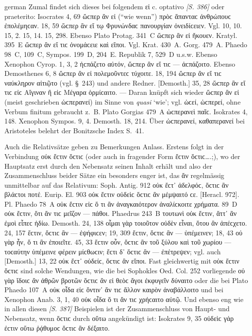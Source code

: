 \begin{otherlanguage*}{german}
Zumal findet sich dieses bei folgendem εἰ c. optativo \hypertarget{p386}{\emph{[S. 386]}}\label{p386} oder praeterito: Isocrates 4, 69 ὥϲπερ ἂν εἰ (“wie wenn”) πρὸϲ ἅπανταϲ ἀνθρώπουϲ ἐπολέμηϲαν. 18, 59 ὥϲπερ ἂν εἴ τῳ Φρυνώνδαϲ πανουργίαν ὀνειδίϲειεν. Vgl. 10, 10. 15, 2. 15, 14. 15, 298. Ebenso Plato Protag. 341~C ὥϲπερ ἂν εἰ ἤκουεν. Kratyl. 395~Ε ὤϲπερ ἂν εἴ τιϲ ὀνομάϲειε καὶ εἴποι. Vgl. Krat. 430~A. Gorg. 479~A. Phaedo 98~C, 109~C, Sympos. 199~D, 204~E. Republik 7, 529~D u.s.w. Ebenso Xenophon Cyrop. 1, 3, 2 ἠϲπάζετο αὐτόν, ὥϲπερ ἂν εἴ τιϲ — ἀϲπάζοιτο. Ebenso Demosthenes 6, 8 ὥϲπερ ἂν εἰ πολεμοῦντεϲ τύχοιτε. 18, 194 ὥϲπερ ἂν εἴ τιϲ ναύκληρον αἰτιῷτο (vgl. §~243) und andere Redner. [Demosth.] 35, 28 ὥϲπερ ἂν εἴ τιϲ εἰϲ Αἴγιναν ἢ εἰϲ Μέγαρα ὁρμίϲαιτο. — Daran knüpft sich wieder ὥϲπερ ἂν εἰ (meist geschrieben ὡϲπε\-ρα\-νεί) im Sinne von \emph{quasi} ‘wie’; vgl. ὡϲεί, ὡϲπερεί, ohne Verbum finitum gebraucht z.~B. Plato Gorgias 479~A ὡϲπερανεὶ παῖϲ. Isokrates 4, 148. Xenophon Sympos. 9, 4. Demosth. 18, 214. Über ὡϲπερανεί, καθαπερανεί bei Aristoteles belehrt der Bonitzsche Index S.~41.

Auch die Relativsätze geben zu Bemerkungen Anlass. Erstens folgt in der Verbindung οὐκ ἔϲτιν ὅϲτιϲ (oder auch in fragender Form ἔϲτιν ὅϲτιϲ….;), wo der Hauptsatz erst durch den Nebensatz seinen Inhalt erhält und also der Zusammenschluss beider Sätze ein besonders enger ist, das ἄν regelmässig unmittelbar auf das Relativum: Soph. Antig. 912 οὐκ ἔϲτ᾽ ἀδελφόϲ, ὅϲτιϲ ἂν βλάϲτοι ποτέ. Eurip. El. 903 οὐκ ἔϲτιν οὐδεὶϲ ὅϲτιϲ ἂν μέμψαιτό ϲε. [Heracl. 972]. Pl. Phaedo 78~A οὐκ ἔϲτιν εἰϲ ὅ τι ἂν ἀναγκαιότερον ἀναλίϲκοιτε χρήματα. 89~D οὐκ ἔϲτιν, ὅτι ἄν τιϲ μεῖζον — πάθοι. Phaedrus 243~Β τουτωνὶ οὐκ ἔϲτιν, ἅττ᾽ ἂν ἐμοὶ εἶπεϲ ἡδίω. Demosth. 24, 138 οἶμαι γὰρ τοιοῦτον οὐδὲν εἶναι, ὅτου ἂν ἀπέϲχετο. 24, 157 ἔϲτιν, ὅϲτιϲ ἂν — ἐψήφιϲεν; 19, 309 ἔϲτιν, ὅϲτιϲ ἂν — ὑπέμεινεν; 18, 43 οὐ γὰρ ἦν, ὅ τι ἂν ἐποιεῖτε. 45, 33 ἔϲτιν οὖν, ὅϲτιϲ ἂν τοῦ ξύλου καὶ τοῦ χωρίου — τοϲαύτην ὑπέμεινε φέρειν μίϲθωϲιν; ἔϲτι δ᾽ ὅϲτιϲ ἂν — ἐπέτρεψεν; vgl. auch [Demosth.] 13, 22 οὐκ ἔϲτ᾽ οὐδείϲ, ὅϲτιϲ ἂν εἴποι. Fast gleichwertig mit οὐκ ἔϲτιν ὅϲτιϲ sind solche Wendungen, wie die bei Sophokles Oed. Col. 252 vorliegende οὐ γὰρ ἴδοιϲ ἂν ἀθρῶν βροτῶν ὅϲτιϲ ἂν εἰ θεὸϲ ἄγοι ἐκφυγεῖν δύναιτο oder die bei Plato Phaedo 107~Α οὐκ οἶδα εἰϲ ὅντιν᾽ ἄν τιϲ ἄλλον καιρὸν ἀναβάλλοιτο und bei Xenophon Anab. 3, 1, 40 οὐκ οἶδα ὅ τι ἄν τιϲ χρήϲαιτο αὐτῷ. Und ebenso eng wie in allen diesen \hypertarget{p387}{\emph{[S. 387]}}\label{p387} Beispielen ist der Zusammenschluss von Haupt- und Nebensatz, wenn ὅϲτιϲ durch οὕτω angekündigt ist: Isokrates 9, 35 οὐδεὶϲ γάρ ἐϲτιν οὕτω ῥᾴθυμοϲ ὅϲτιϲ ἂν δέξαιτο.


\end{otherlanguage*}
